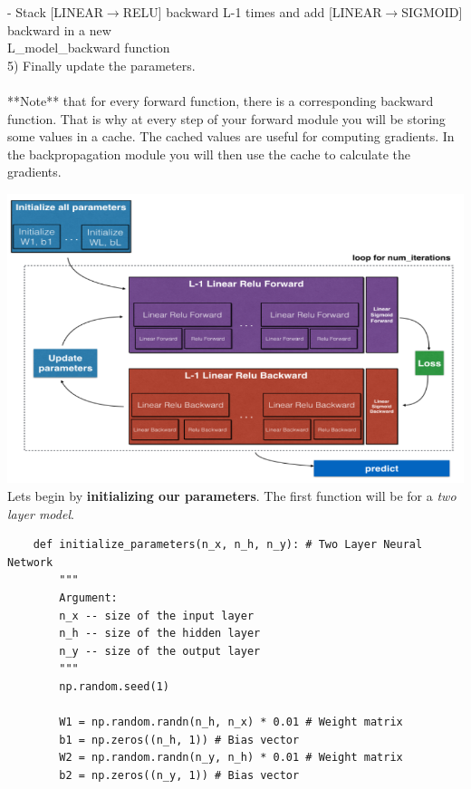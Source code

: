 \documentclass[11pt, a4paper]{article}
\begin{document}
\begin{spacing}{1.1}
	\hspace*{7mm} - Stack [LINEAR$\rightarrow$RELU] backward L-1 times and add [LINEAR$\rightarrow$SIGMOID] backward in a new \\ \hspace*{9.5mm} L\_model\_backward function \\
	\hspace*{3mm} 5) Finally update the parameters. \\~\\
	**Note** that for every forward function, there is a corresponding backward function. That is why at every step of your forward module you will be storing some values in a cache. The cached values are useful for computing gradients. In the backpropagation module you will then use the cache to calculate the gradients. \newpage

	\hspace*{10mm} \includegraphics[scale=.65]{deep_fig} \vspace*{1mm} \\
	Lets begin by \textbf{initializing our parameters}. The first function will be for a \textit{two layer model}.
	\begin{lstlisting}
	def initialize_parameters(n_x, n_h, n_y): # Two Layer Neural Network
		"""
		Argument:
		n_x -- size of the input layer
		n_h -- size of the hidden layer
		n_y -- size of the output layer
		"""
		np.random.seed(1)
		
		W1 = np.random.randn(n_h, n_x) * 0.01 # Weight matrix
		b1 = np.zeros((n_h, 1)) # Bias vector
		W2 = np.random.randn(n_y, n_h) * 0.01 # Weight matrix
		b2 = np.zeros((n_y, 1)) # Bias vector
		

\end{lstlisting}
\end{spacing}
\end{document}
